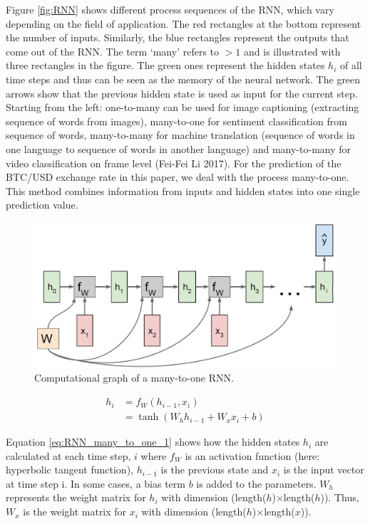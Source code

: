 \documentclass[
]{article}
\begin{document}
Figure \ref{fig:RNN} shows different process sequences of the RNN, which
vary depending on the field of application. The red rectangles at the
bottom represent the number of inputs. Similarly, the blue rectangles
represent the outputs that come out of the RNN. The term `many' refers
to \(>1\) and is illustrated with three rectangles in the figure. The
green ones represent the hidden states \(h_i\) of all time steps and
thus can be seen as the memory of the neural network. The green arrows
show that the previous hidden state is used as input for the current
step. Starting from the left: one-to-many can be used for image
captioning (extracting sequence of words from images), many-to-one for
sentiment classification from sequence of words, many-to-many for
machine translation (sequence of words in one language to sequence of
words in another language) and many-to-many for video classification on
frame level (Fei-Fei Li 2017). For the prediction of the BTC/USD
exchange rate in this paper, we deal with the process many-to-one. This
method combines information from inputs and hidden states into one
single prediction value.

\begin{figure}

{\centering \includegraphics[width=0.7\linewidth]{images/RNN_many_to_one} 

}

\caption{Computational graph of a many-to-one RNN.}\label{fig:RNN_many_to_one}
\end{figure}

\begin{align} \label{eq:RNN_many_to_one_1}
  h_{i} & = f_{W}(h_{i-1}, x_{i}) \\
  & = \tanh(W_{h}h_{i-1} + W_{x}x_{i} + b) \nonumber 
\end{align}

Equation \ref{eq:RNN_many_to_one_1} shows how the hidden states
\(h_{i}\) are calculated at each time step, \(i\) where \(f_{W}\) is an
activation function (here: hyperbolic tangent function), \(h_{i-1}\) is
the previous state and \(x_i\) is the input vector at time step i. In
some cases, a bias term \(b\) is added to the parameters. \(W_{h}\)
represents the weight matrix for \(h_{i}\) with dimension
(length(\(h\))\(\times\)length(\(h\))). Thus, \(W_{x}\) is the weight
matrix for \(x_{i}\) with dimension
(length(\(h\))\(\times\)length(\(x\))).
\end{document}
